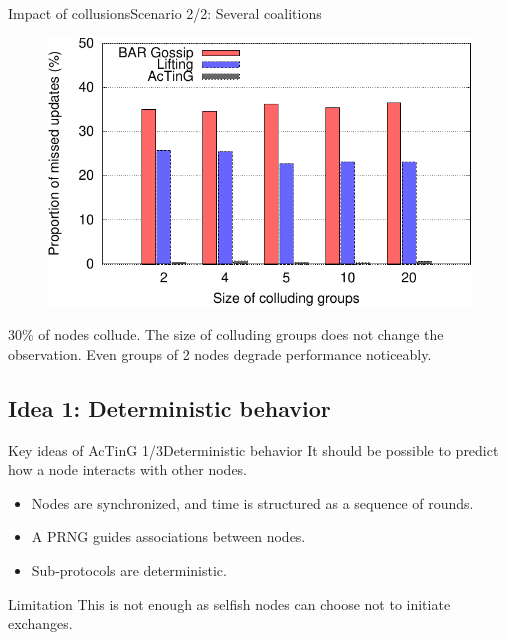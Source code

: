 \documentclass[10pt]{beamer}
\begin{document}
\begin{frame}{Impact of collusions}{Scenario 2/2: Several coalitions}
   \minipage[c][0.7\textheight][s]{\textwidth}
      \begin{figure}
      \centering
      \includegraphics[width=.7\textwidth]{fig/delivery_rate_250_several_group}
      \end{figure}
      \vfill
      \begin{block}{}
        30\% of nodes collude. The size of colluding groups does not change the observation. Even groups of 2 nodes degrade performance noticeably.
      \end{block}
   \endminipage
\end{frame}

\subsection{Idea 1: Deterministic behavior}

\begin{frame}{Key ideas of AcTinG 1/3}{Deterministic behavior}
   \minipage[c][0.7\textheight][s]{\textwidth}
      It should be possible to predict how a node interacts with other nodes. 
      \begin{block}{}
      \begin{itemize}
        \item Nodes are synchronized, and time is structured as a sequence of rounds. 
        \item A PRNG guides associations between nodes.
        \item Sub-protocols are deterministic. 
      \end{itemize}
      \end{block}
      \begin{block}{Limitation}
      This is not enough as selfish nodes can choose not to initiate exchanges. 
      \end{block}
   \endminipage
\end{frame}
\end{document}
